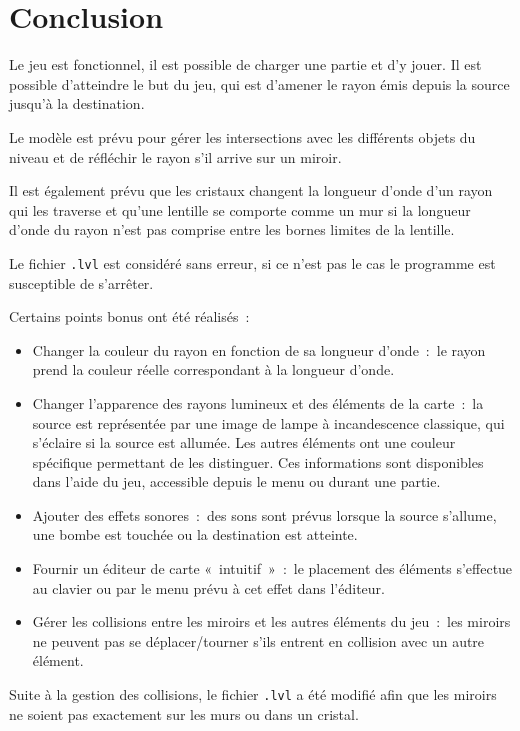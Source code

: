 \documentclass[]{report}
\begin{document}
\newpage
\section{Conclusion}

Le jeu est fonctionnel, il est possible de charger une partie et d’y jouer. Il est possible d’atteindre le but du jeu, qui est d’amener le rayon émis depuis la source jusqu’à la destination. 

Le modèle est prévu pour gérer les intersections avec les différents objets du niveau et de réfléchir le rayon s’il arrive sur un miroir. 

Il est également prévu que les cristaux changent la longueur d’onde d’un rayon qui les traverse et qu’une lentille se comporte comme un mur si la longueur d’onde du rayon n’est pas comprise entre les bornes limites de la lentille.

Le fichier \texttt{.lvl} est considéré sans erreur, si ce n’est pas le cas le programme est susceptible de s’arrêter. 

Certains points bonus ont été réalisés~:~
\begin{itemize}
    \item Changer la couleur du rayon en fonction de sa longueur d’onde~:~le rayon prend la couleur réelle correspondant à la longueur d’onde.
    \item Changer l’apparence des rayons lumineux et des éléments de la carte~:~la source est représentée par une image de lampe à incandescence classique, qui s’éclaire si la source est allumée. Les autres éléments ont une couleur spécifique permettant de les distinguer. Ces informations sont disponibles dans l’aide du jeu, accessible depuis le menu ou durant une partie.
    \item Ajouter des effets sonores~:~des sons sont prévus lorsque la source s’allume, une bombe est touchée ou la destination est atteinte.
    \item Fournir un éditeur de carte «~intuitif~»~:~le placement des éléments s’effectue au clavier ou par le menu prévu à cet effet dans l’éditeur.
    \item Gérer les collisions entre les miroirs et les autres éléments du jeu~:~les miroirs ne peuvent pas se déplacer/tourner s’ils entrent en collision avec un autre élément.
\end{itemize}

Suite à la gestion des collisions, le fichier \texttt{.lvl} a été modifié afin que les miroirs ne soient pas exactement sur les murs ou dans un cristal.
\end{document}
